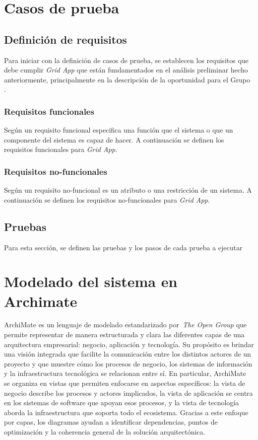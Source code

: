 \section{Casos de prueba}

\subsection{Definición de requisitos}
\noindent
Para iniciar con la definición de casos de prueba, se establecen los requisitos que debe cumplir \textit{Grid App} que están fundamentados en el análisis preliminar hecho anteriormente, principalmente en la descripción de la oportunidad para el Grupo \GRID.

\subsubsection{Requisitos funcionales}
\noindent
Según \textcite{159342} un requisito funcional especifica una función que el sistema o que un componente del sistema es capaz de hacer. A continuación se definen los requisitos funcionales para \textit{Grid App}.


\subsubsection{Requisitos no-funcionales}
\noindent
Según \textcite{4384163} un requisito no-funcional es un atributo o una restricción de un sistema. A continuación se definen los requisitos no-funcionales para \textit{Grid App}.


\subsection{Pruebas}
\noindent
Para esta sección, se definen las pruebas y los pasos de cada prueba a ejecutar 

\section{Modelado del sistema en Archimate}
ArchiMate es un lenguaje de modelado estandarizado por~\textit{The Open Group} que permite representar de manera estructurada y clara las diferentes capas de una arquitectura empresarial: negocio, aplicación y tecnología. Su propósito es brindar una visión integrada que facilite la comunicación entre los distintos actores de un proyecto y que muestre cómo los procesos de negocio, los sistemas de información y la infraestructura tecnológica se relacionan entre sí.
En particular, ArchiMate se organiza en vistas que permiten enfocarse en aspectos específicos: la vista de negocio describe los procesos y actores implicados, la vista de aplicación se centra en los sistemas de software que apoyan esos procesos, y la vista de tecnología aborda la infraestructura que soporta todo el ecosistema. Gracias a este enfoque por capas, los diagramas ayudan a identificar dependencias, puntos de optimización y la coherencia general de la solución arquitectónica.

